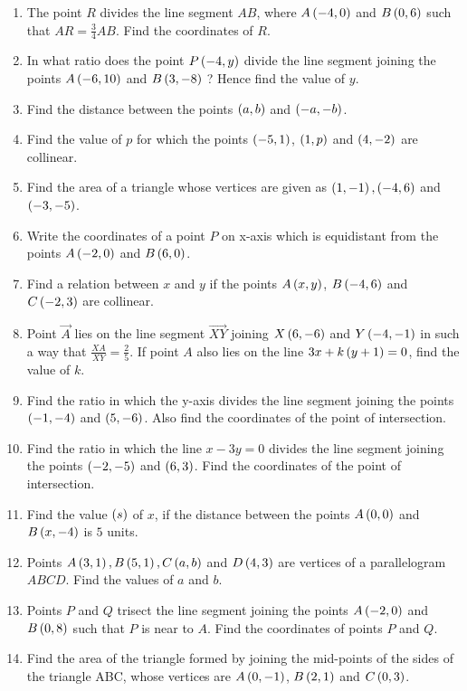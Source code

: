\begin{enumerate}
\item The point $R$ divides the line segment $AB$, where $A\left(- 4, 0\right)$ and $B\left(0, 6\right)$ such that $AR=\frac{3}{4} AB$. Find the coordinates of $R$.

\item In what ratio does the point $P\left(- 4, y\right)$ divide the line segment joining the points $A\left(- 6, 10\right)$ and $B\left(3, - 8\right)$ ? Hence find the value of $y$.

\item Find the distance between the points $\left(a, b\right)$ and $\left(-a, -b\right)$.

\item Find the value of $p$ for which the points $\left(-5, 1\right)$, $\left(1, p\right)$ and $\left(4, -2\right)$ are collinear.

\item Find the area of a triangle whose vertices are given as $\left(1, - 1\right), \left(- 4, 6\right)$ and $\left( -3, - 5\right)$.

\item Write the coordinates of a point $P$ on x-axis which is equidistant from the points $A\left(- 2, 0\right)$ and $B\left(6, 0\right)$.

\item Find a relation between $x$ and $y$ if the points $A\left(x, y\right)$,  $B\left(-4, 6\right) $ and $C\left(-2, 3\right)$ are collinear.

\item Point $\Vec{A}$ lies on the line segment $\Vec{XY}$ joining $X\left(6, - 6\right)$ and $Y\left(-4,-1\right)$ in such a way that $\frac{XA}{XY}=\frac{2}{5}$. If point $A$ also lies on the line $3x + k \left(y + 1\right)= 0$, find the value of $k$.

\item Find the ratio in which the y-axis divides the line segment joining the points $\left(-1, -4\right)$ and $\left(5, -6\right)$. Also find the coordinates of the point of intersection.

\item Find the ratio in which the line $x-3y = 0$ divides the line segment joining the points $\left( -2, -5\right)$ and $\left(6, 3\right)$. Find the coordinates of the point of intersection.

\item Find the value $\left(s\right)$ of $x$, if the distance between the points $A\left(0, 0\right)$ and $B \left(x,-4\right)$  is $5$ units.

\item Points $A\left(3, 1\right), B\left(5, 1\right),C\left(a, b\right)$ and $D\left(4, 3\right)$ are vertices of a parallelogram $ABCD$. Find the values of $a$ and $b$.

\item Points $P$ and $Q$ trisect the line segment joining the points $A\left(-2, 0\right)$ and $B\left(0, 8\right)$ such that $P$ is near to $A$. Find the coordinates of points $P$ and $Q$.

\item Find the area of the triangle formed by joining the mid-points of the sides of the triangle ABC, whose vertices are $A\left(0, - 1\right)$, $B\left(2, 1\right)$ and $C\left(0, 3\right)$.

\end{enumerate}
